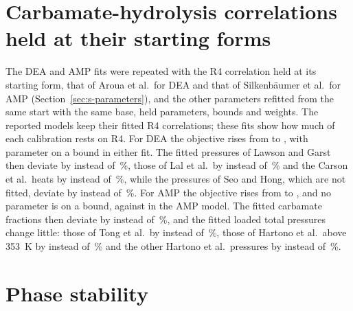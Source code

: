\documentclass[a4paper,11pt]{article}
\begin{document}
\section{Carbamate-hydrolysis correlations held at their starting forms}\label{sec:s-fixed-r4}
The DEA and AMP fits were repeated with the R4 correlation held at its starting form, that of Aroua et al.\ for DEA and that of Silkenb\"aumer et al.\ for AMP (Section~\ref{sec:s-parameters}), and the other parameters refitted from the same start with the same base, held parameters, bounds and weights.
The reported models keep their fitted R4 correlations; these fits show how much of each calibration rests on R4.
For DEA the objective rises from  to , with  parameter on a bound in either fit.
The fitted pressures of Lawson and Garst then deviate by  instead of \,\%, those of Lal et al.\ by  instead of \,\% and the Carson et al.\ heats by  instead of \,\%, while the pressures of Seo and Hong, which are not fitted, deviate by  instead of \,\%.
For AMP the objective rises from  to , and no parameter is on a bound, against  in the AMP model.
The fitted carbamate fractions then deviate by  instead of \,\%, and the fitted loaded total pressures change little: those of Tong et al.\ by  instead of \,\%, those of Hartono et al.\ above \SI{353}{\kelvin} by  instead of \,\% and the other Hartono et al.\ pressures by  instead of \,\%.

\section{Phase stability}\label{sec:s-phase}
\end{document}
